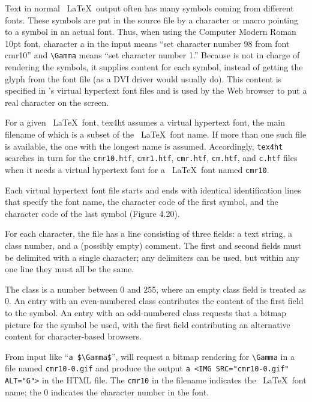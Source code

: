
Text in normal \ \LaTeX\  output often has many symbols coming from different fonts. 
These symbols are put in the source file by a character or macro pointing to a 
symbol in an actual font. Thus, when using the Computer Modern Roman 10pt 
font, character a in the input means ``set character number 98 from font cmr10''
and \verb|\Gamma| means ``set character number 1.'' Because \texht is not in charge of 
rendering the symbols, it supplies content for each symbol, instead of getting the 
glyph from the font file (as a DVI driver would usually do). This content is specified 
in \texht's virtual hypertext font files and is used by the Web browser to put a real 
character on the screen. 


For a given \ \LaTeX\  font, tex4ht assumes a virtual hypertext font,
the main filename of which is a subset of the \ \LaTeX\  font name. If
more than one such file is available, the one with the longest name is
assumed. Accordingly, \verb|tex4ht| searches in turn for the
\verb|cmr10.htf|, \verb|cmr1.htf|, \verb|cmr.htf|, \verb|cm.htf|, and
\verb|c.htf| files when it needs a virtual hypertext font for a \
\LaTeX\  font named \verb|cmr10|. 

Each virtual hypertext font file starts and ends with identical
identification lines that specify the font name, the character code of
the first symbol, and the character code of the last symbol (Figure
4.20). 

For each character, the file has a line consisting of three fields: a
text string, a class number, and a (possibly empty) comment. The first
and second fields must be delimited with a single character; any
delimiters can be used, but within any one line they must all be the
same. 

The class is a number between 0 and 255, where an empty class field is treated 
as 0. An entry with an even-numbered class contributes the content of the first field 
to the symbol. An entry with an odd-numbered class requests that a bitmap picture 
for the symbol be used, with the first field contributing an alternative content for 
character-based browsers. 

From input like ``\verb|a $\Gamma$|'', \texht will request a bitmap rendering
for \verb|\Gamma| in a file named \verb|cmr10-0.gif| and produce the output
\verb|a <IMG SRC="cmr10-0.gif" ALT="G">| in the HTML file. The \verb|cmr10| in
the filename indicates the \ \LaTeX\  font name; the 0 indicates the character
number in the font. 

